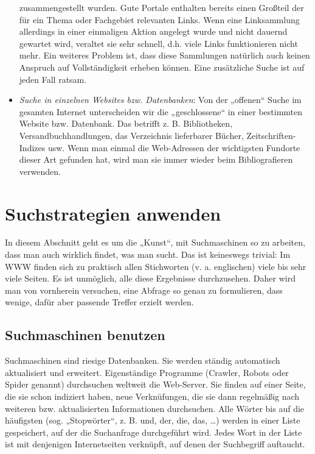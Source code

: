 \documentclass[]{book}
\theoremstyle{definition}
\theoremstyle{definition}
\theoremstyle{definition}
\theoremstyle{remark}
\begin{document}
\begin{itemize}
  zusammengestellt wurden. Gute Portale enthalten bereits einen Großteil
  der für ein Thema oder Fachgebiet relevanten Links. Wenn eine
  Linksammlung allerdings in einer einmaligen Aktion angelegt wurde und
  nicht dauernd gewartet wird, veraltet sie sehr schnell, d.h. viele
  Links funktionieren nicht mehr. Ein weiteres Problem ist, dass diese
  Sammlungen natürlich auch keinen Anspruch auf Vollständigkeit erheben
  können. Eine zusätzliche Suche ist auf jeden Fall ratsam.
\item
  \emph{Suche in einzelnen Websites bzw. Datenbanken}: Von der
  „offenen`` Suche im gesamten Internet unterscheiden wir die
  „geschlossene`` in einer bestimmten Website bzw. Datenbank. Das
  betrifft z. B. Bibliotheken, Versandbuchhandlungen, das Verzeichnis
  lieferbarer Bücher, Zeitschriften-Indizes usw. Wenn man einmal die
  Web-Adressen der wichtigsten Fundorte dieser Art gefunden hat, wird
  man sie immer wieder beim Bibliografieren verwenden.
\end{itemize}

\section{Suchstrategien anwenden}\label{suchstrategien-anwenden}

In diesem Abschnitt geht es um die „Kunst``, mit Suchmaschinen so zu
arbeiten, dass man auch wirklich findet, was man sucht. Das ist
keineswegs trivial: Im WWW finden sich zu praktisch allen Stichworten
(v. a. englischen) viele bis sehr viele Seiten. Es ist unmöglich, alle
diese Ergebnisse durchzusehen. Daher wird man von vornherein versuchen,
eine Abfrage so genau zu formulieren, dass wenige, dafür aber passende
Treffer erzielt werden.

\subsection{Suchmaschinen benutzen}\label{suchmaschinen-benutzen}

Suchmaschinen sind riesige Datenbanken. Sie werden ständig automatisch
aktualisiert und erweitert. Eigenständige Programme (Crawler, Robots
oder Spider genannt) durchsuchen weltweit die Web-Server. Sie finden auf
einer Seite, die sie schon indiziert haben, neue Verknüfungen, die sie
dann regelmäßig nach weiteren bzw. aktualisierten Informationen
durchsuchen. Alle Wörter bis auf die häufigsten (sog. „Stopwörter``, z.
B. und, der, die, das, \ldots{}) werden in einer Liste gespeichert, auf
der die Suchanfrage durchgeführt wird. Jedes Wort in der Liste ist mit
denjenigen Internetseiten verknüpft, auf denen der Suchbegriff
auftaucht.
\end{document}
